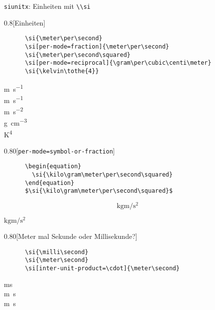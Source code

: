\begin{frame}[fragile]{\texttt{siunitx}: Einheiten mit \lstinline+\\si+}
  \begin{CodeExample}{0.8}[Einheiten]
    \begin{lstlisting}
      \si{\meter\per\second}
      \si[per-mode=fraction]{\meter\per\second}
      \si{\meter\per\second\squared}
      \si[per-mode=reciprocal]{\gram\per\cubic\centi\meter}
      \si{\kelvin\tothe{4}}
    \end{lstlisting}
  \CodeResult
    \strut
    \si{\meter\per\second} \\
    \si[per-mode=fraction]{\meter\per\second} \\
    \si{\meter\per\second\squared} \\
    \si[per-mode=reciprocal]{\gram\per\cubic\centi\meter} \\
    \si{\kelvin\tothe{4}}
  \end{CodeExample}
  \begin{CodeExample}{0.80}[\texttt{per-mode=symbol-or-fraction}]
    \begin{lstlisting}
      \begin{equation}
        \si{\kilo\gram\meter\per\second\squared}
      \end{equation}
      $\si{\kilo\gram\meter\per\second\squared}$
    \end{lstlisting}
  \CodeResult
    \removedisplayskip
    \begin{minipage}[c][3\baselineskip][c]{\textwidth}
      \begin{equation}
        \si{\kilo\gram\meter\per\second\squared}
      \end{equation}
    \end{minipage}
    $\si{\kilo\gram\meter\per\second\squared}$
  \end{CodeExample}
  \begin{CodeExample}{0.80}[Meter mal Sekunde oder Millisekunde?]
    \begin{lstlisting}
      \si{\milli\second}
      \si{\meter\second}
      \si[inter-unit-product=\cdot]{\meter\second}
    \end{lstlisting}
  \CodeResult
    \strut
    \si{\milli\second} \\
    \si{\meter\second} \\
    \si[inter-unit-product=\cdot]{\meter\second}
  \end{CodeExample}
\end{frame}

